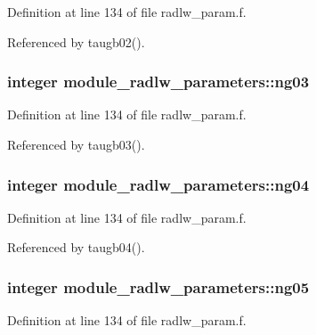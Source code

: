 Definition at line 134 of file radlw\+\_\+param.\+f.



Referenced by taugb02().

\subsubsection[{\texorpdfstring{ng03}{ng03}}]{\setlength{\rightskip}{0pt plus 5cm}integer module\+\_\+radlw\+\_\+parameters\+::ng03}\hypertarget{group__module__radlw__main_gad226d9951e041e991f463a9a90e7f68b}{}\label{group__module__radlw__main_gad226d9951e041e991f463a9a90e7f68b}


Definition at line 134 of file radlw\+\_\+param.\+f.



Referenced by taugb03().

\subsubsection[{\texorpdfstring{ng04}{ng04}}]{\setlength{\rightskip}{0pt plus 5cm}integer module\+\_\+radlw\+\_\+parameters\+::ng04}\hypertarget{group__module__radlw__main_gafd05a94bc29e5a5d792c0c140fe3a0c4}{}\label{group__module__radlw__main_gafd05a94bc29e5a5d792c0c140fe3a0c4}


Definition at line 134 of file radlw\+\_\+param.\+f.



Referenced by taugb04().

\subsubsection[{\texorpdfstring{ng05}{ng05}}]{\setlength{\rightskip}{0pt plus 5cm}integer module\+\_\+radlw\+\_\+parameters\+::ng05}\hypertarget{group__module__radlw__main_ga1e70690afc3ba2cca4344d6df3d26ee8}{}\label{group__module__radlw__main_ga1e70690afc3ba2cca4344d6df3d26ee8}


Definition at line 134 of file radlw\+\_\+param.\+f.



